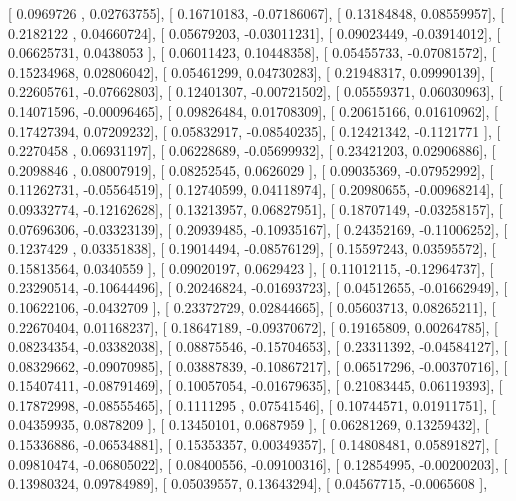 \documentclass{article}
\begin{document}
       [ 0.0969726 ,  0.02763755],
       [ 0.16710183, -0.07186067],
       [ 0.13184848,  0.08559957],
       [ 0.2182122 ,  0.04660724],
       [ 0.05679203, -0.03011231],
       [ 0.09023449, -0.03914012],
       [ 0.06625731,  0.0438053 ],
       [ 0.06011423,  0.10448358],
       [ 0.05455733, -0.07081572],
       [ 0.15234968,  0.02806042],
       [ 0.05461299,  0.04730283],
       [ 0.21948317,  0.09990139],
       [ 0.22605761, -0.07662803],
       [ 0.12401307, -0.00721502],
       [ 0.05559371,  0.06030963],
       [ 0.14071596, -0.00096465],
       [ 0.09826484,  0.01708309],
       [ 0.20615166,  0.01610962],
       [ 0.17427394,  0.07209232],
       [ 0.05832917, -0.08540235],
       [ 0.12421342, -0.1121771 ],
       [ 0.2270458 ,  0.06931197],
       [ 0.06228689, -0.05699932],
       [ 0.23421203,  0.02906886],
       [ 0.2098846 ,  0.08007919],
       [ 0.08252545,  0.0626029 ],
       [ 0.09035369, -0.07952992],
       [ 0.11262731, -0.05564519],
       [ 0.12740599,  0.04118974],
       [ 0.20980655, -0.00968214],
       [ 0.09332774, -0.12162628],
       [ 0.13213957,  0.06827951],
       [ 0.18707149, -0.03258157],
       [ 0.07696306, -0.03323139],
       [ 0.20939485, -0.10935167],
       [ 0.24352169, -0.11006252],
       [ 0.1237429 ,  0.03351838],
       [ 0.19014494, -0.08576129],
       [ 0.15597243,  0.03595572],
       [ 0.15813564,  0.0340559 ],
       [ 0.09020197,  0.0629423 ],
       [ 0.11012115, -0.12964737],
       [ 0.23290514, -0.10644496],
       [ 0.20246824, -0.01693723],
       [ 0.04512655, -0.01662949],
       [ 0.10622106, -0.0432709 ],
       [ 0.23372729,  0.02844665],
       [ 0.05603713,  0.08265211],
       [ 0.22670404,  0.01168237],
       [ 0.18647189, -0.09370672],
       [ 0.19165809,  0.00264785],
       [ 0.08234354, -0.03382038],
       [ 0.08875546, -0.15704653],
       [ 0.23311392, -0.04584127],
       [ 0.08329662, -0.09070985],
       [ 0.03887839, -0.10867217],
       [ 0.06517296, -0.00370716],
       [ 0.15407411, -0.08791469],
       [ 0.10057054, -0.01679635],
       [ 0.21083445,  0.06119393],
       [ 0.17872998, -0.08555465],
       [ 0.1111295 ,  0.07541546],
       [ 0.10744571,  0.01911751],
       [ 0.04359935,  0.0878209 ],
       [ 0.13450101,  0.0687959 ],
       [ 0.06281269,  0.13259432],
       [ 0.15336886, -0.06534881],
       [ 0.15353357,  0.00349357],
       [ 0.14808481,  0.05891827],
       [ 0.09810474, -0.06805022],
       [ 0.08400556, -0.09100316],
       [ 0.12854995, -0.00200203],
       [ 0.13980324,  0.09784989],
       [ 0.05039557,  0.13643294],
       [ 0.04567715, -0.0065608 ],
\end{document}
